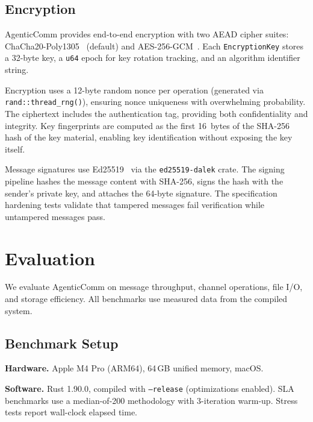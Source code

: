 \documentclass[10pt, twocolumn]{article}
\begin{document}
\subsection{Encryption}
\label{sec:encryption}

AgenticComm provides end-to-end encryption with two AEAD cipher suites: ChaCha20-Poly1305~\cite{bernstein2012chacha} (default) and AES-256-GCM~\cite{aes_gcm_2007}. Each \texttt{EncryptionKey} stores a 32-byte key, a \texttt{u64} epoch for key rotation tracking, and an algorithm identifier string.

Encryption uses a 12-byte random nonce per operation (generated via \texttt{rand::thread\_rng()}), ensuring nonce uniqueness with overwhelming probability. The ciphertext includes the authentication tag, providing both confidentiality and integrity. Key fingerprints are computed as the first 16~bytes of the SHA-256 hash of the key material, enabling key identification without exposing the key itself.

Message signatures use Ed25519~\cite{ed25519_2012} via the \texttt{ed25519-dalek} crate. The signing pipeline hashes the message content with SHA-256, signs the hash with the sender's private key, and attaches the 64-byte signature. The specification hardening tests validate that tampered messages fail verification while untampered messages pass.


\section{Evaluation}
\label{sec:evaluation}

We evaluate AgenticComm on message throughput, channel operations, file I/O, and storage efficiency. All benchmarks use measured data from the compiled system.

\subsection{Benchmark Setup}

\textbf{Hardware.} Apple M4 Pro (ARM64), 64\,GB unified memory, macOS.

\textbf{Software.} Rust 1.90.0, compiled with \texttt{--release} (optimizations enabled). SLA benchmarks use a median-of-200 methodology with 3-iteration warm-up. Stress tests report wall-clock elapsed time.
\end{document}
